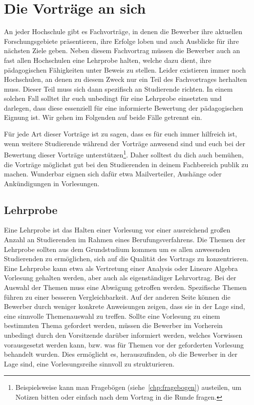 \section{Die Vorträge an sich}
An jeder Hochschule gibt es Fachvorträge, in denen die Bewerber ihre aktuellen Forschungsgebiete präsentieren, ihre Erfolge loben und auch Ausblicke für ihre nächsten Ziele geben. Neben diesem Fachvortrag müssen die Bewerber auch an fast allen Hochschulen eine Lehrprobe halten, welche dazu dient, ihre pädagogischen Fähigkeiten unter Beweis zu stellen. Leider existieren immer noch Hochschulen, an denen zu diesem Zweck nur ein Teil des Fachvortrages herhalten muss. Dieser Teil muss sich dann spezifisch an Studierende richten. In einem solchen Fall solltet ihr euch unbedingt für eine Lehrprobe einsetzten und darlegen, dass diese essenziell für eine informierte Bewertung der pädagogischen Eignung ist. Wir gehen im Folgenden auf beide Fälle getrennt ein.

Für jede Art dieser Vorträge ist zu sagen, dass es für euch immer hilfreich ist, wenn weitere Studierende während der Vorträge anwesend sind und euch bei der Bewertung dieser Vorträge unterstützen\footnote{Beispielsweise kann man Fragebögen (siehe~\ref{chp:fragebogen}) austeilen, um Notizen bitten oder einfach nach dem Vortrag in die Runde fragen.}. Daher solltest du dich auch bemühen, die Vorträge möglichst gut bei den Studierenden in deinem Fachbereich publik zu machen. Wunderbar eignen sich dafür etwa Mailverteiler, Aushänge oder Ankündigungen in Vorlesungen.

\subsection{Lehrprobe}
Eine Lehrprobe ist das Halten einer Vorlesung vor einer ausreichend großen Anzahl an Studierenden im Rahmen eines Berufungsverfahrens. Die Themen der Lehrprobe sollten aus dem Grundstudium kommen um es allen anwesenden Studierenden zu ermöglichen, sich auf die Qualität des Vortrags zu konzentrieren. Eine Lehrprobe kann etwa als Vertretung einer Analysis oder Lineare Algebra Vorlesung gehalten werden, aber auch als eigenständiger Lehrvortrag. Bei der Auswahl der Themen muss eine Abwägung getroffen werden. Spezifische Themen führen zu einer besseren Vergleichbarkeit. Auf der anderen Seite können die Bewerber durch weniger konkrete Anweisungen zeigen, dass sie in der Lage sind, eine sinnvolle Themenauswahl zu treffen. Sollte eine Vorlesung zu einem bestimmten Thema gefordert werden, müssen die Bewerber im Vorherein unbedingt durch den Vorsitzende darüber informiert werden, welches Vorwissen vorausgesetzt werden kann, bzw. was für Themen vor der geforderten Vorlesung behandelt wurden. Dies ermöglicht es, herauszufinden, ob die Bewerber in der Lage sind, eine Vorlesungsreihe sinnvoll zu strukturieren.

